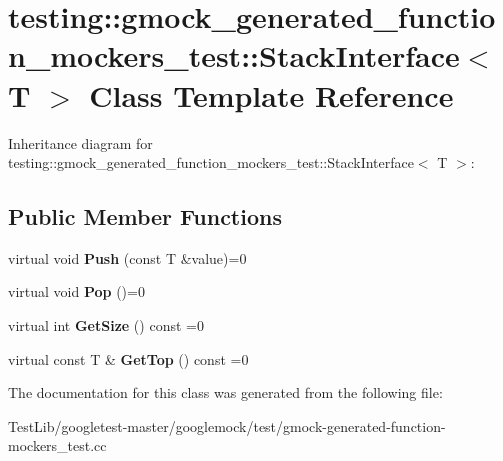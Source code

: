 \hypertarget{classtesting_1_1gmock__generated__function__mockers__test_1_1StackInterface}{}\section{testing\+:\+:gmock\+\_\+generated\+\_\+function\+\_\+mockers\+\_\+test\+:\+:Stack\+Interface$<$ T $>$ Class Template Reference}
\label{classtesting_1_1gmock__generated__function__mockers__test_1_1StackInterface}


Inheritance diagram for testing\+:\+:gmock\+\_\+generated\+\_\+function\+\_\+mockers\+\_\+test\+:\+:Stack\+Interface$<$ T $>$\+:
\subsection*{Public Member Functions}
\begin{DoxyCompactItemize}
\item 
\mbox{\label{classtesting_1_1gmock__generated__function__mockers__test_1_1StackInterface_a49448f6195021fee947d37b80b6e5d30}} 
virtual void {\bfseries Push} (const T \&value)=0
\item 
\mbox{\label{classtesting_1_1gmock__generated__function__mockers__test_1_1StackInterface_a1a6646d1d9febe90c607b9b3e4539b67}} 
virtual void {\bfseries Pop} ()=0
\item 
\mbox{\label{classtesting_1_1gmock__generated__function__mockers__test_1_1StackInterface_a537ec8647a2333f50e5f923a85b90eba}} 
virtual int {\bfseries Get\+Size} () const =0
\item 
\mbox{\label{classtesting_1_1gmock__generated__function__mockers__test_1_1StackInterface_af36e32b9ae568100363466d1ebf95364}} 
virtual const T \& {\bfseries Get\+Top} () const =0
\end{DoxyCompactItemize}


The documentation for this class was generated from the following file\+:\begin{DoxyCompactItemize}
\item 
Test\+Lib/googletest-\/master/googlemock/test/gmock-\/generated-\/function-\/mockers\+\_\+test.\+cc\end{DoxyCompactItemize}
